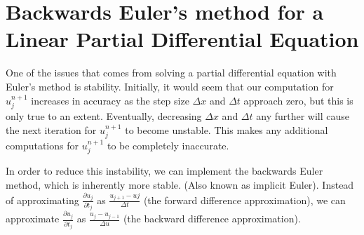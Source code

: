 \documentclass[11pt]{article}
\begin{document}
\newpage
\section*{Backwards Euler's method for a Linear Partial Differential Equation}
One of the issues that comes from solving a partial differential equation with Euler's method is stability. Initially, it would seem that our computation for $u^{n+1}_{j}$ increases in accuracy as the step size $\Delta x$ and $\Delta t$ approach zero, but this is only true to an extent. Eventually, decreasing $\Delta x$ and $\Delta t$ any further will cause the next iteration for $u^{n+1}_{j}$ to become unstable. This makes any additional computations for $u^{n+1}_{j}$ to be completely inaccurate.

In order to reduce this instability, we can implement the backwards Euler method, which is inherently more stable. (Also known as implicit Euler). Instead of approximating $\frac{\partial u_j}{\partial t_j}$ as $\frac{u_{j+1}-u{j}}{\Delta t}$ (the forward difference approximation), we can approximate $\frac{\partial u_j}{\partial t_j}$ as $\frac{u_{j}-u_{j-1}}{\Delta u}$ (the backward difference approximation).
\end{document}
